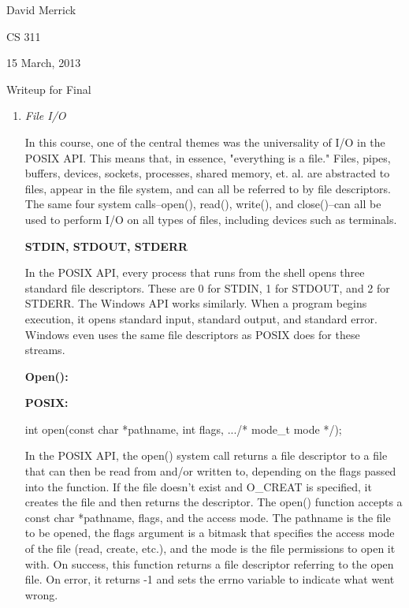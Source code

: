 \documentclass[letterpaper,10pt,titlepage]{article}
\newcommand{\ignore}[2]{\hspace{0in}#2} %
\newcommand{\tab}{\hspace*{2em}} %
\begin{document}
David Merrick

CS 311

15 March, 2013

\begin{center}
{\LARGE Writeup for Final}
\end{center}

\begin{enumerate} 
\item \emph{File I/O}

\tab In this course, one of the central themes was the universality of I/O in the POSIX API. This means that, in essence, "everything is a file." Files, pipes, buffers, devices, sockets, processes, shared memory, et. al. are abstracted to files, appear in the file system, and can all be referred to by file descriptors. The same four system calls--open(), read(), write(), and close()--can all be used to perform I/O on all types of files, including devices such as terminals. \newline

\textbf{STDIN, STDOUT, STDERR} \newline

\tab In the POSIX API, every process that runs from the shell opens three standard file descriptors. These are 0 for STDIN, 1 for STDOUT, and 2 for STDERR. The Windows API works similarly. When a program begins execution, it opens standard input, standard output, and standard error. Windows even uses the same file descriptors as POSIX does for these streams. \newline

\textbf{Open():}

\textbf{POSIX:}

int open(const char *pathname, int flags, .../* mode\_t mode */);\newline

\tab In the POSIX API, the open() system call returns a file descriptor to a file that can then be read from and/or written to, depending on the flags passed into the function. If the file doesn't exist and O\_CREAT is specified, it creates the file and then returns the descriptor. The open() function accepts a const char *pathname, flags, and the access mode. The pathname is the file to be opened, the flags argument is a bitmask that specifies the access mode of the file (read, create, etc.), and the mode is the file permissions to open it with\ignore{\[TLPI, pg. 72\]}. On success, this function returns a file descriptor referring to the open file. On error, it returns -1 and sets the errno variable to indicate what went wrong. \newline %


\end{enumerate}
\end{document}
